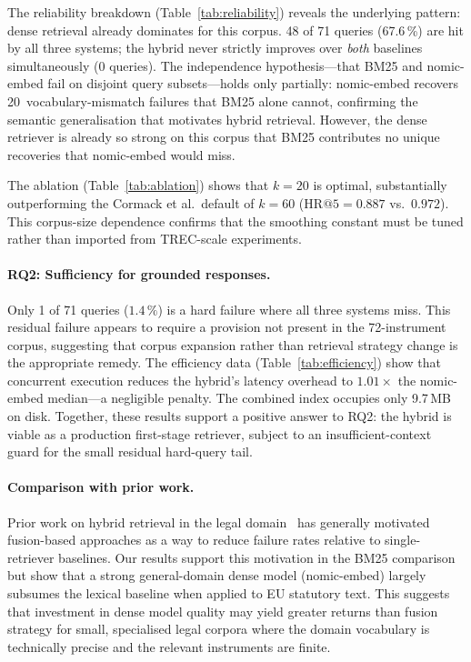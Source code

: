 \documentclass[sigconf,screen]{acmart}
\makeatletter
\newcommand{\HR}[1]{\mathrm{HR}@{#1}}
\newcommand{\nomicshort}{nomic-embed\xspace}
\makeatother
\begin{document}
The reliability breakdown (Table~\ref{tab:reliability}) reveals the
underlying pattern: dense retrieval already dominates for this
corpus.  48 of 71 queries (67.6\,\%) are hit by all three systems;
the hybrid never strictly improves over \emph{both} baselines
simultaneously (0 queries).  The independence hypothesis---that BM25
and \nomicshort fail on disjoint query subsets---holds only
partially: \nomicshort recovers 20~vocabulary-mismatch failures that
BM25 alone cannot, confirming the semantic generalisation that
motivates hybrid retrieval.  However, the dense retriever is already
so strong on this corpus that BM25 contributes no unique recoveries
that \nomicshort would miss.

The ablation (Table~\ref{tab:ablation}) shows that $k{=}20$ is
optimal, substantially outperforming the Cormack et al.\ default of
$k{=}60$ ($\HR{5}{=}0.887$ vs.\ $0.972$).  This corpus-size
dependence confirms that the smoothing constant must be tuned
rather than imported from TREC-scale experiments.

\paragraph{RQ2: Sufficiency for grounded responses.}
Only 1 of 71 queries ($1.4\,\%$) is a hard failure where all three
systems miss.  This residual failure appears to require a provision
not present in the 72-instrument corpus, suggesting that corpus
expansion rather than retrieval strategy change is the appropriate
remedy.  The efficiency data (Table~\ref{tab:efficiency}) show
that concurrent execution reduces the hybrid's latency overhead to
$1.01\times$ the \nomicshort median---a negligible penalty.  The
combined index occupies only 9.7\,MB on disk.  Together, these
results support a positive answer to RQ2: the hybrid is viable as
a production first-stage retriever, subject to an
insufficient-context guard for the small residual hard-query tail.

\paragraph{Comparison with prior work.}
Prior work on hybrid retrieval in the legal
domain~\cite{lrage2024,hyparag2024} has generally motivated
fusion-based approaches as a way to reduce failure rates relative
to single-retriever baselines.  Our results support this motivation
in the BM25 comparison but show that a strong general-domain dense
model (\nomicshort) largely subsumes the lexical baseline when
applied to EU statutory text.  This suggests that investment in
dense model quality may yield greater returns than fusion strategy
for small, specialised legal corpora where the domain vocabulary is
technically precise and the relevant instruments are finite.
\end{document}
